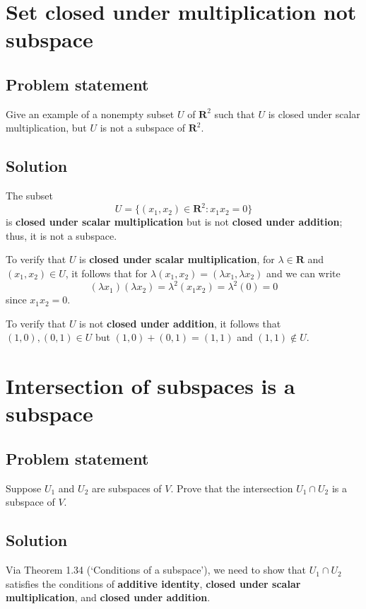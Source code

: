 \documentclass{article}
\begin{document}
\clearpage

\renewcommand{\thesection}{8}
\section{Set closed under multiplication not subspace}
\subsection*{Problem statement}
Give an example of a nonempty subset $U$ of $\mathbf{R}^2$ such that $U$ is closed under scalar multiplication, but $U$ is not a subspace of $\mathbf{R}^2$.

\subsection*{Solution}
The subset 
\[U=\{(x_1,x_2)\in\textbf{R}^2:x_1x_2=0\}\]
is \textbf{closed under scalar multiplication} but is not \textbf{closed under addition}; thus, it is not a subspace. 

To verify that $U$ is \textbf{closed under scalar multiplication}, for $\lambda\in\textbf{R}$ and $(x_1,x_2)\in U$, it follows that for $\lambda(x_1,x_2)=(\lambda x_1,\lambda x_2)$ and we can write
\[(\lambda x_1)(\lambda x_2)=\lambda^2(x_1x_2)=\lambda^2(0)=0\]
since $x_1x_2=0$.

To verify that $U$ is not \textbf{closed under addition}, it follows that $(1,0),(0,1)\in U$ but $(1,0)+(0,1)=(1,1)$ and $(1,1)\notin U$.

\clearpage

\renewcommand{\thesection}{10}
\section{Intersection of subspaces is a subspace}
\subsection*{Problem statement}
Suppose $U_1$ and $U_2$ are subspaces of $V$. 
Prove that the intersection $U_1\cap U_2$ is a subspace of $V$.

\subsection*{Solution}
Via Theorem 1.34 (‘Conditions of a subspace’), we need to show that $U_1\cap U_2$ satisfies the conditions of \textbf{additive identity}, \textbf{closed under scalar multiplication}, and \textbf{closed under addition}.
\end{document}
